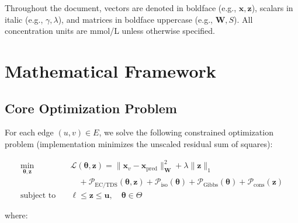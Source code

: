 \documentclass[12pt,a4paper]{article}
\theoremstyle{plain}
\theoremstyle{definition}
\theoremstyle{remark}
\begin{document}
Throughout the document, vectors are denoted in boldface (e.g., $\mathbf{x}, \mathbf{z}$), scalars in italic (e.g., $\gamma, \lambda$), and matrices in boldface uppercase (e.g., $\mathbf{W}, S$). All concentration units are mmol/L unless otherwise specified.

\newpage

\section{Mathematical Framework}\label{sec:math_framework}

\subsection{Core Optimization Problem}

For each edge $(u,v) \in E$, we solve the following constrained optimization problem (implementation minimizes the unscaled residual sum of squares):

\begin{equation}\label{eq:master_problem}
	\begin{aligned}
		\min_{\boldsymbol{\theta}, \mathbf{z}} \quad & \mathcal{L}(\boldsymbol{\theta}, \mathbf{z}) = \|\mathbf{x}_v - \mathbf{x}_{\text{pred}}\|_{\mathbf{W}}^2 + \lambda \|\mathbf{z}\|_1                                                                           \\
		                                             & \quad + \mathcal{P}_{\text{EC/TDS}}(\boldsymbol{\theta}, \mathbf{z}) + \mathcal{P}_{\text{iso}}(\boldsymbol{\theta}) + \mathcal{P}_{\text{Gibbs}}(\boldsymbol{\theta}) + \mathcal{P}_{\text{cons}}(\mathbf{z}) \\
		\text{subject to} \quad                      & \boldsymbol{\ell} \leq \mathbf{z} \leq \mathbf{u}, \quad \boldsymbol{\theta} \in \Theta
	\end{aligned}
\end{equation}

where:
\end{document}
